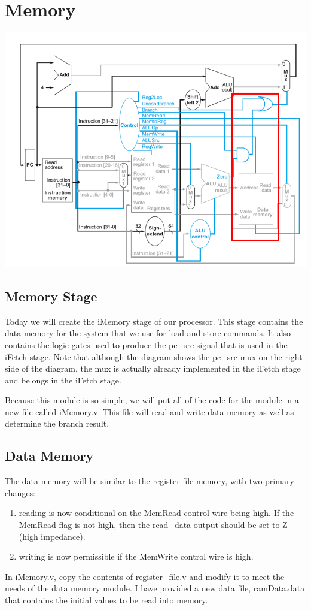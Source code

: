 \chapter{Memory}

\begin{center}
\includegraphics[width=5.5in]{../images/data_memory.png}
\end{center}

\section{Memory Stage}
Today we will create the iMemory stage of our processor.  This stage contains the data memory for the system that we use for load and store commands.  It also contains the logic gates used to produce the pc\_src signal that is used in the iFetch stage.  Note that although the diagram shows the pc\_src mux on the right side of the diagram, the mux is actually already implemented in the iFetch stage and belongs in the iFetch stage.

Because this module is so simple, we will put all of the code for the module in a new file called iMemory.v.  This file will read and write data memory as well as determine the branch result.

\section{Data Memory}

The data memory will be similar to the register file memory, with two primary changes:
\begin{enumerate}
	\item reading is now conditional on the MemRead control wire being high.  If the MemRead flag is not high, then the read\_data output should be set to Z (high impedance).
	\item writing is now permissible if the MemWrite control wire is high.
\end{enumerate}
In iMemory.v, copy the contents of register\_file.v and modify it to meet the needs of the data memory module.  I have provided a new data file, ramData.data that contains the initial values to be read into memory.

